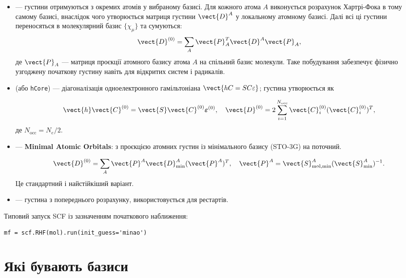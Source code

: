 \begin{itemize}
	\item {} --- густини отримуються з окремих атомів у вибраному базисі.
	      Для кожного атома $A$ виконується розрахунок Хартрі-Фока в тому самому базисі,
	      внаслідок чого утворюється матриця густини $\vect{D}^A$ у локальному атомному базисі.
	      Далі всі ці густини переносяться в молекулярний базис $\{\chi_\mu\}$ та сумуються:
	      \[
		      \vect{D}^{(0)} = \sum_A \vect{P}_A^{T} \vect{D}^A \vect{P}_A,
	      \]
	      де $\vect{P}_A$ --- матриця проєкції атомного базису атома $A$ на спільний базис молекули.
	      Таке побудування забезпечує фізично узгоджену початкову густину навіть для відкритих систем і радикалів.

	\item {} (або \texttt{hCore}) --- діагоналізація одноелектронного гамільтоніана
	      $\vect{hC = S C \varepsilon}$; густина утворюється як

	      \[
		      \vect{h} \vect{C}^{(0)} = \vect{S} \vect{C}^{(0)} \boldsymbol{\varepsilon}^{(0)}, \quad \vect{D}^{(0)} = 2 \sum_{i=1}^{N_{\text{occ}}} \vect{C}_i^{(0)} (\vect{C}_i^{(0)})^T,
	      \] де $N_{\text{occ}} = N_e/2$.

	\item {} --- \textbf{Minimal Atomic Orbitals}: з проєкцією атомних густин із мінімального базису (STO-3G) на поточний.

	      \[
		      \vect{D}^{(0)} = \sum_A \vect{P}^A \vect{D}^A_{\text{min}} (\vect{P}^A)^T, \quad \vect{P}^A = \vect{S}_{\text{mol,min}}^A (\vect{S}^A_{\text{min}})^{-1}.
	      \]
	      Це стандартний і найстійкіший варіант.

	\item {} --- густина з попереднього розрахунку, використовується для рестартів.

\end{itemize}

Типовий запуск SCF із зазначенням початкового наближення:
\begin{verbatim}
mf = scf.RHF(mol).run(init_guess='minao')
\end{verbatim}

\section{Які бувають базиси}

